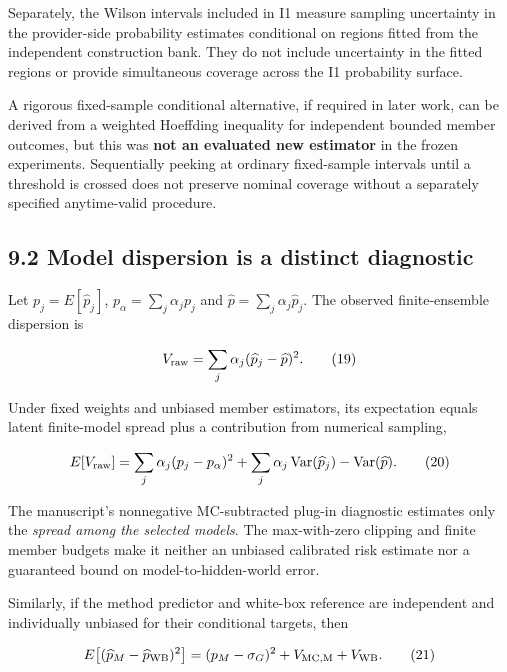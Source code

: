 \documentclass[10pt,a4paper]{article}
\begin{document}
Separately, the Wilson intervals included in I1 measure sampling uncertainty in the provider-side probability estimates conditional on regions fitted from the independent construction bank. They do not include uncertainty in the fitted regions or provide simultaneous coverage across the I1 probability surface.

A rigorous fixed-sample conditional alternative, if required in later work, can be derived from a weighted Hoeffding inequality for independent bounded member outcomes, but this was \textbf{not an evaluated new estimator} in the frozen experiments. Sequentially peeking at ordinary fixed-sample intervals until a threshold is crossed does not preserve nominal coverage without a separately specified anytime-valid procedure.

\subsection*{9.2 Model dispersion is a distinct diagnostic}

Let $p_j=E[\widehat p_j]$, $p_\alpha=\sum_j\alpha_jp_j$ and $\widehat p=\sum_j\alpha_j\widehat p_j$. The observed finite-ensemble dispersion is

\begin{equation*}
V_{\rm raw}
=\sum_j\alpha_j(\widehat p_j-\widehat p)^2.
\tag{19}
\end{equation*}

Under fixed weights and unbiased member estimators, its expectation equals latent finite-model spread plus a contribution from numerical sampling,

\begin{equation*}
E[V_{\rm raw}]
=\sum_j\alpha_j(p_j-p_\alpha)^2+
\sum_j\alpha_j\operatorname{Var}(\widehat p_j)
-\operatorname{Var}(\widehat p).
\tag{20}
\end{equation*}

The manuscript's nonnegative MC-subtracted plug-in diagnostic estimates only the \emph{spread among the selected models}. The max-with-zero clipping and finite member budgets make it neither an unbiased calibrated risk estimate nor a guaranteed bound on model-to-hidden-world error.

Similarly, if the method predictor and white-box reference are independent and individually unbiased for their conditional targets, then

\begin{equation*}
E\!\left[(\widehat p_M-\widehat p_{\rm WB})^2\right]
=(p_M-\sigma_G)^2+V_{\rm MC,M}+V_{\rm WB}.
\tag{21}
\end{equation*}
\end{document}
